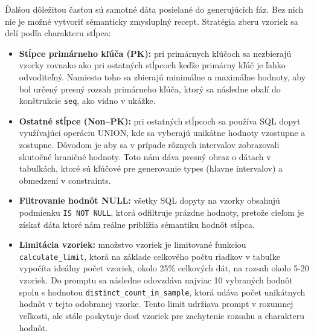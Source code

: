 Ďalšou dôležitou časťou sú samotné dáta posielané do generujúcich fáz. Bez nich nie je možné vytvoriť sémanticky zmysluplný recept. Stratégia zberu vzoriek sa delí podľa charakteru stĺpca:

\begin{itemize}
    \item \textbf{Stĺpce primárneho kľúča (PK):} pri primárnych kľúčoch sa nezbierajú vzorky rovnako ako pri ostatných stĺpcoch keďže primárny kľúč je ľahko odvoditeľný. Namiesto toho sa zbierajú minimálne a maximálne hodnoty, aby bol určený presný rozsah primárneho kľúča, ktorý sa následne obalí do konštrukcie \texttt{seq}, ako vidno v ukážke. 
    \item \textbf{Ostatné stĺpce (Non–PK):} pri ostatných stĺpcoch sa používa SQL dopyt využívajúci operáciu UNION, kde sa vyberajú unikátne hodnoty vzostupne a zostupne. Dôvodom je aby sa v prípade rôznych intervalov zobrazovali skutočné hraničné hodnoty. Toto nám dáva presný obraz o dátach v tabuľkách, ktoré sú kľúčové pre generovanie types (hlavne intervalov) a obmedzení v constraints.
    \item \textbf{Filtrovanie hodnôt NULL:} všetky SQL dopyty na vzorky obsahujú podmienku \texttt{IS NOT NULL}, ktorá odfiltruje prázdne hodnoty, pretože cieľom je získať dáta ktoré nám reálne priblížia sémantiku hodnôt stĺpca.
    \item \textbf{Limitácia vzoriek:} množstvo vzoriek je limitované funkciou \texttt{calculate\_limit}, ktorá na základe celkového počtu riadkov v tabuľke vypočíta ideálny počet vzoriek, okolo 25\% celkových dát, na rozsah okolo 5-20 vzoriek. Do promptu sa následne odovzdáva najviac 10 vybraných hodnôt spolu s hodnotou \texttt{distinct\_count\_in\_sample}, ktorá udáva počet unikátnych hodnôt v tejto odobranej vzorke. Tento limit udržiava prompt v rozumnej veľkosti, ale stále poskytuje dosť vzoriek pre zachytenie rozsahu a charakteru hodnôt.
\end{itemize}

